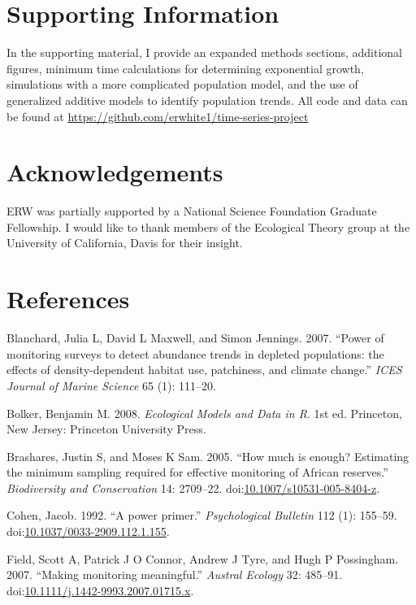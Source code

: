 \documentclass[12pt,]{article}
\begin{document}
\section{Supporting Information}\label{supporting-information}

In the supporting material, I provide an expanded methods sections,
additional figures, minimum time calculations for determining
exponential growth, simulations with a more complicated population
model, and the use of generalized additive models to identify population
trends. All code and data can be found at
\url{https://github.com/erwhite1/time-series-project}

\section{Acknowledgements}\label{acknowledgements}

ERW was partially supported by a National Science Foundation Graduate
Fellowship. I would like to thank members of the Ecological Theory group
at the University of California, Davis for their insight.

\section{References}\label{references}

\hypertarget{refs}{}
\hypertarget{ref-Blanchard2007}{}
Blanchard, Julia L, David L Maxwell, and Simon Jennings. 2007. ``Power
of monitoring surveys to detect abundance trends in depleted
populations: the effects of density-dependent habitat use, patchiness,
and climate change.'' \emph{ICES Journal of Marine Science} 65 (1):
111--20.

\hypertarget{ref-Bolker2008}{}
Bolker, Benjamin M. 2008. \emph{Ecological Models and Data in R}. 1st
ed. Princeton, New Jersey: Princeton University Press.

\hypertarget{ref-Brashares2005}{}
Brashares, Justin S, and Moses K Sam. 2005. ``How much is enough?
Estimating the minimum sampling required for effective monitoring of
African reserves.'' \emph{Biodiversity and Conservation} 14: 2709--22.
doi:\href{https://doi.org/10.1007/s10531-005-8404-z}{10.1007/s10531-005-8404-z}.

\hypertarget{ref-Cohen1992}{}
Cohen, Jacob. 1992. ``A power primer.'' \emph{Psychological Bulletin}
112 (1): 155--59.
doi:\href{https://doi.org/10.1037/0033-2909.112.1.155}{10.1037/0033-2909.112.1.155}.

\hypertarget{ref-Field2007}{}
Field, Scott A, Patrick J O Connor, Andrew J Tyre, and Hugh P
Possingham. 2007. ``Making monitoring meaningful.'' \emph{Austral
Ecology} 32: 485--91.
doi:\href{https://doi.org/10.1111/j.1442-9993.2007.01715.x}{10.1111/j.1442-9993.2007.01715.x}.
\end{document}
